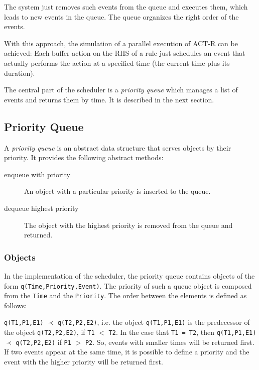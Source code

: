 The system just removes such events from the queue and executes them, which leads to new events in the queue. The queue organizes the right order of the events.

With this approach, the simulation of a parallel execution of ACT-R can be achieved: Each buffer action on the RHS of a rule just schedules an event that actually performs the action at a specified time (the current time plus its duration). 

The central part of the scheduler is a \emph{priority queue} which manages a list of events and returns them by time. It is described in the next section.

\subsection{Priority Queue}

A \emph{priority queue} is an abstract data structure that serves objects by their priority. It provides the following abstract methods:

\begin{description}
 \item[enqueue with priority] An object with a particular priority is inserted to the queue. 
 \item[dequeue highest priority] The object with the highest priority is removed from the queue and returned.
\end{description}

\subsubsection{Objects}

In the implementation of the scheduler, the priority queue contains objects of the form \lstinline|q(Time,Priority,Event)|. The priority of such a queue object is composed from the \lstinline|Time| and the \lstinline|Priority|. The order between the elements is defined as follows:

\begin{definition}
\lstinline|q(T1,P1,E1)| $\prec$ \lstinline|q(T2,P2,E2)|, i.e. the object \lstinline|q(T1,P1,E1)| is the predecessor of the object \lstinline|q(T2,P2,E2)|, if \lstinline|T1| $<$ \lstinline|T2|. In the case that \lstinline|T1 = T2|, then \lstinline|q(T1,P1,E1)| $\prec$ \lstinline|q(T2,P2,E2)| if \lstinline|P1| $>$ \lstinline|P2|. So, events with smaller times will be returned first. If two events appear at the same time, it is possible to define a priority and the event with the higher priority will be returned first. 
\end{definition}

